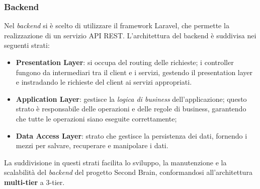 \documentclass[a4paper,10pt]{article}
\begin{document}
\subsubsection{Backend}
Nel \textit{backend} si è scelto di utilizzare il framework Laravel, che permette la realizzazione di un servizio API REST. L'architettura del backend è suddivisa nei seguenti strati: 
\begin{itemize}
    \item \textbf{Presentation Layer}: si occupa del routing delle richieste; i controller fungono da intermediari tra il client e i servizi, gestendo il presentation layer e instradando le richieste del client ai servizi appropriati.
    \item \textbf{Application Layer}: gestisce la \textit{logica di business} dell'applicazione; questo strato è responsabile delle operazioni e delle regole di business, garantendo che tutte le operazioni siano eseguite correttamente;
    \item \textbf{Data Access Layer}: strato che gestisce la persistenza dei dati, fornendo i mezzi per salvare, recuperare e manipolare i dati.
\end{itemize}
La suddivisione in questi strati facilita lo sviluppo, la manutenzione e la scalabilità del \textit{backend} del progetto Second Brain, conformandosi all'architettura \textbf{multi-tier} a 3-tier. 
\end{document}
